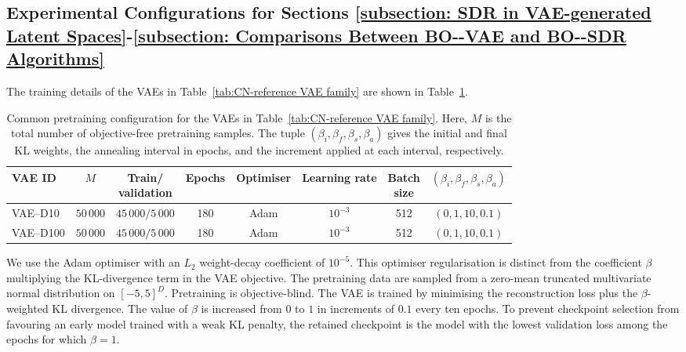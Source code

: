 \documentclass[pdflatex,sn-mathphys-num]{sn-jnl}%
\theoremstyle{thmstyleone}%
\theoremstyle{thmstyletwo}%
\theoremstyle{thmstylethree}%
\begin{document}
\begin{appendices}
\subsection{Experimental Configurations for Sections \ref{subsection: SDR in VAE-generated Latent Spaces}\mbox{-}\ref{subsection: Comparisons Between BO--VAE and BO--SDR Algorithms}}\label{Appendix Numerical Experiments Details}
The training details of the VAEs in Table~\ref{tab:CN-reference VAE family} are shown in Table~\ref{tab:cn-reference-vae-pretraining}. 

\begin{table}[h]
\caption{Common pretraining configuration for the VAEs in Table~\ref{tab:CN-reference VAE family}. Here, $M$ is the total number of objective-free pretraining samples. The tuple $(\beta_i,\beta_f,\beta_s,\beta_a)$ gives the initial and final KL weights, the annealing interval in epochs, and the increment applied at each interval, respectively.}
\label{tab:cn-reference-vae-pretraining}
\centering
\small
\setlength{\tabcolsep}{3pt}
\renewcommand{\arraystretch}{1.1}

\begin{tabularx}{\linewidth}{@{}l c c c c c c c @{}}
\toprule
VAE ID
& $M$
& \shortstack{Train/\\validation}
& Epochs
& Optimiser
& Learning rate
& \shortstack{Batch\\size}
& $(\beta_i,\beta_f,\beta_s,\beta_a)$ \\
\midrule

VAE--D10
& $50\,000$
& $45\,000/5\,000$
& 180
& Adam
& $10^{-3}$
& 512
& $(0,1,10,0.1)$ \\

VAE--D100
& $50\,000$
& $45\,000/5\,000$
& 180
& Adam
& $10^{-3}$
& 512
& $(0,1,10,0.1)$ \\

\bottomrule
\end{tabularx}
\end{table}

We use the Adam optimiser with an $L_2$ weight-decay coefficient of $10^{-5}$. This optimiser regularisation is distinct from the coefficient $\beta$ multiplying the KL-divergence term in the VAE objective. The pretraining data are sampled from a zero-mean truncated multivariate normal distribution on $[-5,5]^D$. Pretraining is objective-blind. The VAE is trained by minimising the reconstruction loss plus the $\beta$-weighted KL divergence. The value of $\beta$ is increased from $0$ to $1$ in increments of $0.1$ every ten epochs. To prevent checkpoint selection from favouring an early model trained with a weak KL penalty, the retained checkpoint is the model with the lowest validation loss among the epochs for which $\beta=1$.


\end{appendices}
\end{document}
